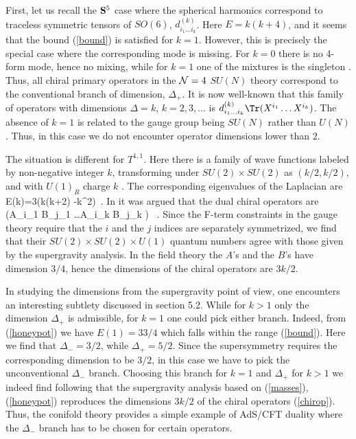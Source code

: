 First, let us recall the ${\bf S}^5$ case where the spherical
harmonics correspond to
traceless symmetric tensors of $SO(6)$, $d^{(k)}_{i_1\ldots i_k}$. 
Here $E= k(k+4)$, and it seems that
the bound (\ref{bound}) is satisfied for $k=1$. However, this is precisely the
special case where the corresponding mode is missing.
For $k=0$ there is no 4-form mode, hence no
mixing, while for $k=1$ one of the mixtures is the singleton \cite{Kim}.
Thus, all chiral primary 
operators in the ${\cal N}=4$ $SU(N)$ theory correspond to
the conventional branch of dimension, $\Delta_+$.
It is now well-known that this family of operators with dimensions
$\Delta= k$, $k=2,3,\ldots$
is $d^{(k)}_{i_1\ldots i_k} \Tr (X^{i_1} \ldots X^{i_k})$.
The absence of $k=1$ is related to the gauge group being $SU(N)$ rather
than $U(N)$. Thus, in this case we do not encounter operator
dimensions lower than $2$.

The situation is different for $T^{1,1}$. Here there is a family of wave
functions labeled by non-negative integer $k$, transforming under 
$SU(2)\times SU(2)$  as $(k/2,k/2)$, and with
$U(1)_R$ charge $k$ \cite{Gubser,RD,Ceres}.
The corresponding eigenvalues of the Laplacian
are 
\be \label{honeypot}
E(k)=3\left(k(k+2)
-{k^2}\right)\
.
\ee
In \cite{KW} it was argued that the dual chiral operators are
\be \label{chirop}
\tr (A_{i_1} B_{j_1} \ldots A_{i_k} B_{j_k} )
\ .
\ee
Since the F-term constraints in the gauge theory require that the
$i$ and the $j$ indices are separately symmetrized, we find that
their $SU(2)\times SU(2)\times U(1)$ quantum numbers agree with those
given by the supergravity analysis. In the field theory
the $A$'s and the $B$'s have dimension $3/4$, hence the dimensions
of the chiral operators are $3k/2$.

In studying the dimensions from the supergravity point of view, one encounters
an interesting subtlety discussed in section 5.2. While for $k>1$ only
the dimension $\Delta_+$ is admissible, for $k=1$ one could pick either 
branch. Indeed, from (\ref{honeypot}) we have
$E(1)=33/4$ which falls within the range (\ref{bound}). Here we
find that $\Delta_-=3/2$, while $\Delta_+=5/2$. Since the supersymmetry 
requires the corresponding dimension to be $3/2$, in this case
we have to pick the unconventional $\Delta_-$ branch. Choosing this
branch for $k=1$ and $\Delta_+$ for $k>1$ we indeed find
following \cite{Gubser,RD,Ceres}
that the supergravity analysis based on (\ref{masses}), (\ref{honeypot})
reproduces the dimensions $3k/2$ of the chiral operators (\ref{chirop}).
Thus, the conifold theory provides
a simple example of AdS/CFT duality where the $\Delta_-$ branch
has to be chosen for certain operators.

